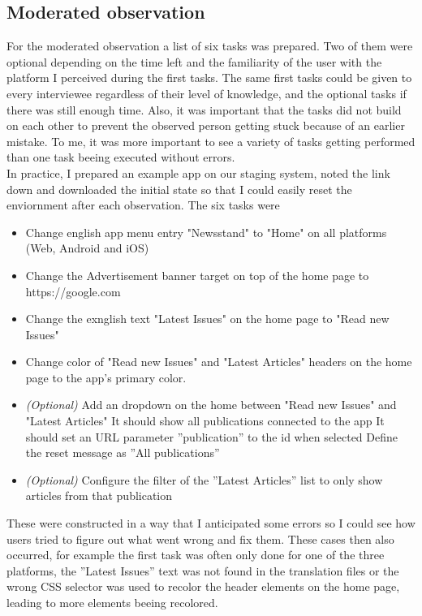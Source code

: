 \subsection{Moderated observation}
\label{subsec:modobs}
For the moderated observation a list of six tasks was prepared. Two of them were optional depending on the time left and the familiarity of the user with the platform I perceived during the first tasks.
The same first tasks could be given to every interviewee regardless of their level of knowledge, and the optional tasks if there was still enough time.
Also, it was important that the tasks did not build on each other to prevent the observed person getting stuck because of an earlier mistake.
To me, it was more important to see a variety of tasks getting performed than one task beeing executed without errors. 
\\
In practice, I prepared an example app on our staging system, noted the link down and downloaded the initial state so that I could easily reset the enviornment after each observation.
The six tasks were
\begin{itemize}
  \item Change english app menu entry "Newsstand" to "Home" on all platforms (Web, Android and iOS)
  \item Change the Advertisement banner target on top of the home page to https://google.com 
  \item Change the exnglish text "Latest Issues" on the home page to "Read new Issues"
  \item Change color of "Read new Issues" and "Latest Articles" headers on the home page to the app's primary color.
  \item \textit{(Optional)} Add an dropdown on the home between "Read new Issues" and "Latest Articles"
    \subitem It should show all publications connected to the app
    \subitem It should set an URL parameter ''publication'' to the id when selected
    \subitem Define the reset message as ''All publications''
  \item \textit{(Optional)} Configure the filter of the ''Latest Articles'' list to only show articles from that publication
\end{itemize}

These were constructed in a way that I anticipated some errors so I could see how users tried to figure out what went wrong and fix them.
These cases then also occurred, for example the first task was often only done for one of the three platforms, the ''Latest Issues'' text was not found in the translation files or
the wrong CSS selector was used to recolor the header elements on the home page, leading to more elements beeing recolored.

